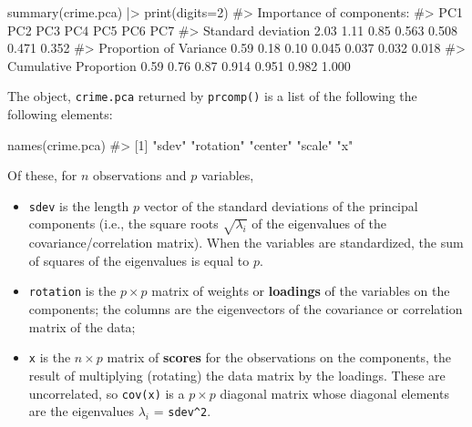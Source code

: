 \documentclass[
  letterpaper,
  10pt,
  krantz2]{krantz}
\makeatletter
\newenvironment{Shaded}{\begin{snugshade}}{\end{snugshade}}
\newcommand{\AttributeTok}[1]{\textcolor[rgb]{0.40,0.45,0.13}{#1}}
\newcommand{\CommentTok}[1]{\textcolor[rgb]{0.37,0.37,0.37}{#1}}
\newcommand{\DecValTok}[1]{\textcolor[rgb]{0.68,0.00,0.00}{#1}}
\newcommand{\FunctionTok}[1]{\textcolor[rgb]{0.28,0.35,0.67}{#1}}
\newcommand{\NormalTok}[1]{\textcolor[rgb]{0.00,0.23,0.31}{#1}}
\newcommand{\SpecialCharTok}[1]{\textcolor[rgb]{0.37,0.37,0.37}{#1}}
\providecommand{\tightlist}{%
  \setlength{\itemsep}{0pt}\setlength{\parskip}{0pt}}\usepackage{longtable,booktabs,array}
\newenvironment{kframe}{%
  \medskip{}
  \setlength{\fboxsep}{.8em}
  \def\at@end@of@kframe{}%
  \ifinner\ifhmode%
  \def\at@end@of@kframe{\end{minipage}}%
  \begin{minipage}{\columnwidth}%
  \fi\fi%
  \def\FrameCommand##1{\hskip\@totalleftmargin \hskip-\fboxsep
  \colorbox{shadecolor}{##1}\hskip-\fboxsep
      \hskip-\linewidth \hskip-\@totalleftmargin \hskip\columnwidth}%
  \MakeFramed {\advance\hsize-\width
    \@totalleftmargin\z@ \linewidth\hsize
    \@setminipage}}%
{\par\unskip\endMakeFramed%
  \at@end@of@kframe}
\renewenvironment{Shaded}{\begin{kframe}}{\end{kframe}}
\makeatother
\begin{document}
\begin{Shaded}
\begin{Highlighting}[]
\FunctionTok{summary}\NormalTok{(crime.pca) }\SpecialCharTok{|\textgreater{}} \FunctionTok{print}\NormalTok{(}\AttributeTok{digits=}\DecValTok{2}\NormalTok{)}
\CommentTok{\#\textgreater{} Importance of components:}
\CommentTok{\#\textgreater{}                         PC1  PC2  PC3   PC4   PC5   PC6   PC7}
\CommentTok{\#\textgreater{} Standard deviation     2.03 1.11 0.85 0.563 0.508 0.471 0.352}
\CommentTok{\#\textgreater{} Proportion of Variance 0.59 0.18 0.10 0.045 0.037 0.032 0.018}
\CommentTok{\#\textgreater{} Cumulative Proportion  0.59 0.76 0.87 0.914 0.951 0.982 1.000}
\end{Highlighting}
\end{Shaded}

The object, \texttt{crime.pca} returned by \texttt{prcomp()} is a list
of the following the following elements:

\begin{Shaded}
\begin{Highlighting}[]
\FunctionTok{names}\NormalTok{(crime.pca)}
\CommentTok{\#\textgreater{} [1] "sdev"     "rotation" "center"   "scale"    "x"}
\end{Highlighting}
\end{Shaded}

Of these, for \(n\) observations and \(p\) variables,

\begin{itemize}
\tightlist
\item
  \texttt{sdev} is the length \(p\) vector of the standard deviations of
  the principal components (i.e., the square roots \(\sqrt{\lambda_i}\)
  of the eigenvalues of the covariance/correlation matrix). When the
  variables are standardized, the sum of squares of the eigenvalues is
  equal to \(p\).
\item
  \texttt{rotation} is the \(p \times p\) matrix of weights or
  \textbf{loadings} of the variables on the components; the columns are
  the eigenvectors of the covariance or correlation matrix of the data;
\item
  \texttt{x} is the \(n \times p\) matrix of \textbf{scores} for the
  observations on the components, the result of multiplying (rotating)
  the data matrix by the loadings. These are uncorrelated, so
  \texttt{cov(x)} is a \(p \times p\) diagonal matrix whose diagonal
  elements are the eigenvalues \(\lambda_i\) = \texttt{sdev\^{}2}.
\end{itemize}
\end{document}
